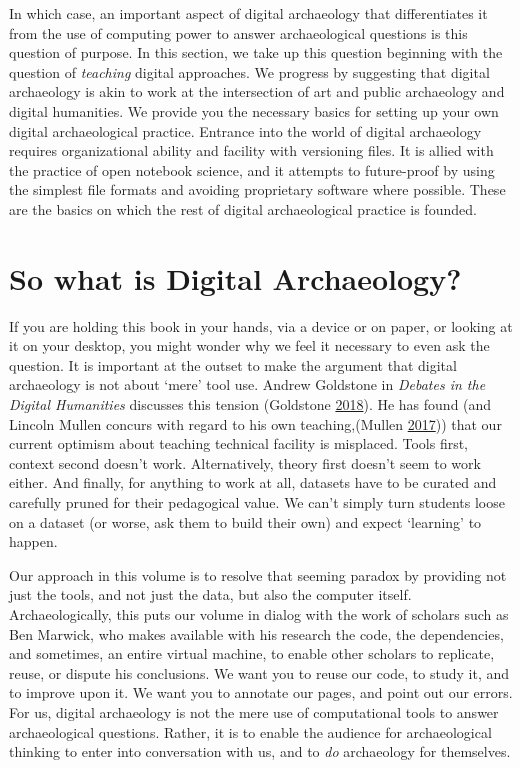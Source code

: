 \documentclass[english,]{book}
\begin{document}
In which case, an important aspect of digital archaeology that
differentiates it from the use of computing power to answer
archaeological questions is this question of purpose. In this section,
we take up this question beginning with the question of \emph{teaching}
digital approaches. We progress by suggesting that digital archaeology
is akin to work at the intersection of art and public archaeology and
digital humanities. We provide you the necessary basics for setting up
your own digital archaeological practice. Entrance into the world of
digital archaeology requires organizational ability and facility with
versioning files. It is allied with the practice of open notebook
science, and it attempts to future-proof by using the simplest file
formats and avoiding proprietary software where possible. These are the
basics on which the rest of digital archaeological practice is founded.

\section{So what is Digital
Archaeology?}\label{so-what-is-digital-archaeology}

If you are holding this book in your hands, via a device or on paper, or
looking at it on your desktop, you might wonder why we feel it necessary
to even ask the question. It is important at the outset to make the
argument that digital archaeology is not about `mere' tool use. Andrew
Goldstone in \emph{Debates in the Digital Humanities} discusses this
tension (Goldstone
\protect\hyperlink{ref-goldstone_teaching_2018}{2018}). He has found
(and Lincoln Mullen concurs with regard to his own teaching,(Mullen
\protect\hyperlink{ref-mullen_confirmation_2017}{2017})) that our
current optimism about teaching technical facility is misplaced. Tools
first, context second doesn't work. Alternatively, theory first doesn't
seem to work either. And finally, for anything to work at all, datasets
have to be curated and carefully pruned for their pedagogical value. We
can't simply turn students loose on a dataset (or worse, ask them to
build their own) and expect `learning' to happen.

Our approach in this volume is to resolve that seeming paradox by
providing not just the tools, and not just the data, but also the
computer itself. Archaeologically, this puts our volume in dialog with
the work of scholars such as Ben Marwick, who makes available with his
research the code, the dependencies, and sometimes, an entire virtual
machine, to enable other scholars to replicate, reuse, or dispute his
conclusions. We want you to reuse our code, to study it, and to improve
upon it. We want you to annotate our pages, and point out our errors.
For us, digital archaeology is not the mere use of computational tools
to answer archaeological questions. Rather, it is to enable the audience
for archaeological thinking to enter into conversation with us, and to
\emph{do} archaeology for themselves.
\end{document}
